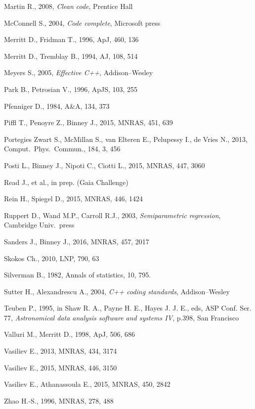 \documentclass[12pt]{article}
\begin{document}
\begin{thebibliography}{99}
Martin R., 2008, \textsl{Clean code}, Prentice Hall

McConnell S., 2004, \textsl{Code complete}, Microsoft press

Merritt D., Fridman T., 1996, ApJ, 460, 136

Merritt D., Tremblay B., 1994, AJ, 108, 514

Meyers S., 2005, \textsl{Effective C++}, Addison--Wesley

Park B., Petrosian V., 1996, ApJS, 103, 255

Pfenniger D., 1984, A\&A, 134, 373

Piffl T., Penoyre Z., Binney J., 2015, MNRAS, 451, 639

Portegies Zwart S., McMillan S., van Elteren E., Pelupessy I., de Vries N., 2013, Comput.\ Phys.\ Commun., 184, 3, 456

Posti L., Binney J., Nipoti C., Ciotti L., 2015, MNRAS, 447, 3060

Read J., et al., in prep. (Gaia Challenge)

Rein H., Spiegel D., 2015, MNRAS, 446, 1424

Ruppert D., Wand M.P., Carroll R.J., 2003, \textsl{Semiparametric regression}, Cambridge Univ.\ press

Sanders J., Binney J., 2016, MNRAS, 457, 2017

Skokos Ch., 2010, LNP, 790, 63

Silverman B., 1982, Annals of statistics, 10, 795.

Sutter H., Alexandrescu A., 2004, \textsl{C++ coding standards}, Addison--Wesley

Teuben P., 1995, in Shaw R. A., Payne H. E., Hayes J. J. E., eds, ASP Conf. Ser. 77,
\textsl{Astronomical data analysis software and systems IV}, p.398, San Francisco

Valluri M., Merritt D., 1998, ApJ, 506, 686

Vasiliev E., 2013, MNRAS, 434, 3174

Vasiliev E., 2015, MNRAS, 446, 3150

Vasiliev E., Athanassoula E., 2015, MNRAS, 450, 2842

Zhao H.-S., 1996, MNRAS, 278, 488

\end{thebibliography}
\end{document}
